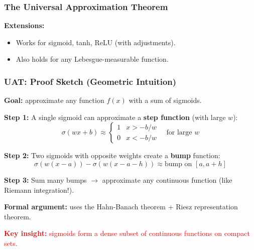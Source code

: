 \documentclass[notes,11pt, aspectratio=169]{beamer}
\newcommand{\vx}{\mathbf{x}}
\newcommand{\vw}{\mathbf{w}}
\newcommand{\R}{\mathbb{R}}
\begin{document}
\begin{frame}
\frametitle{The Universal Approximation Theorem}


\vspace{6pt}
\textbf{Extensions:}
\begin{itemize}
    \item Works for sigmoid, tanh, ReLU (with adjustments).
    \item Also holds for any Lebesgue-measurable function.
\end{itemize}
\end{frame}

\begin{frame}
\frametitle{UAT: Proof Sketch (Geometric Intuition)}

\textbf{Goal:} approximate any function $f(x)$ with a sum of sigmoids.

\vspace{4pt}
\textbf{Step 1:} A single sigmoid can approximate a \textbf{step function} (with large $w$):
\[
    \sigma(wx + b) \approx \begin{cases} 1 & x > -b/w \\ 0 & x < -b/w \end{cases} \quad \text{for large } w
\]

\textbf{Step 2:} Two sigmoids with opposite weights create a \textbf{bump} function:
\[
    \sigma(w(x - a)) - \sigma(w(x - a - h)) \approx \text{bump on } [a, a+h]
\]

\textbf{Step 3:} Sum many bumps $\to$ approximate any continuous function (like Riemann integration!).

\vspace{8pt}
\textbf{Formal argument:} uses the Hahn-Banach theorem + Riesz representation theorem.

\vspace{6pt}
\begin{center}
\textcolor{red}{\textbf{Key insight:} sigmoids form a dense subset of continuous functions on compact sets.}
\end{center}
\end{frame}
\end{document}
